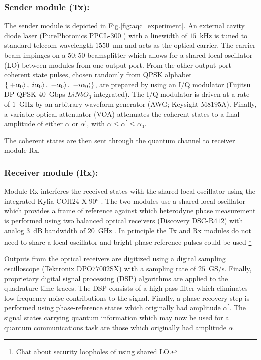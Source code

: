 \subsubsection{Sender module (Tx):} The sender module is depicted in Fig.\ref{fig:aqc_experiment}. An external cavity diode laser (PurePhotonics PPCL-$300$ ) with a linewidth of $15$~kHz is tuned to standard telecom wavelength $1550$~nm and acts as the optical carrier. The carrier beam impinges on a $50:50$ beamsplitter which allows for a shared local oscillator (LO) between modules from one output port. From the other output port  coherent state pulses, chosen randomly from QPSK alphabet $\left\{ \ket{+ \alpha_0}, \ket{i \alpha_0}, \ket{-\alpha_0}, \ket{-i \alpha_0}\right\}$, are prepared by using an I/Q modulator (Fujitsu DP-QPSK $40$~Gbps $LiNbO_3$-integrated). The I/Q modulator is driven at a rate of $1$~GHz by an arbitrary waveform generator (AWG; Keysight M$8195$A). Finally, a variable optical attenuator (VOA) attenuates the coherent states to a final amplitude of either $\alpha$ or $\alpha^\prime$, with $\alpha \le \alpha^\prime \le \alpha_0$.

The coherent states are then sent through the quantum channel to receiver module Rx.

\subsubsection{Receiver module (Rx):}
Module Rx interferes the received states with the shared local oscillator using the integrated Kylia COH$24$-X $90\si{\degree}$ . The two modules use a shared local oscillator which provides a frame of reference against which heterodyne phase measurement is performed using two balanced optical receivers (Discovery DSC-R$412$) with analog $3$~dB bandwidth of $20$~GHz . In principle the Tx and Rx modules do not need to share a local oscillator and bright phase-reference pulses could be used \footnote{Chat about security loopholes of using shared LO.}

Outputs from the optical receivers are digitized using a digital sampling oscilloscope (Tektronix DPO$77002$SX) with a sampling rate of $25$~GS/s. Finally, proprietary digital signal processing (DSP) algorithms are applied to the quadrature time traces. The DSP consists of a high-pass filter which eliminates low-frequency noise contributions to the signal. Finally, a phase-recovery step is performed using phase-reference states which originally had amplitude $\alpha^\prime$. The signal states carrying quantum information which may now be used for a quantum communications task are those which originally had amplitude $\alpha$.


